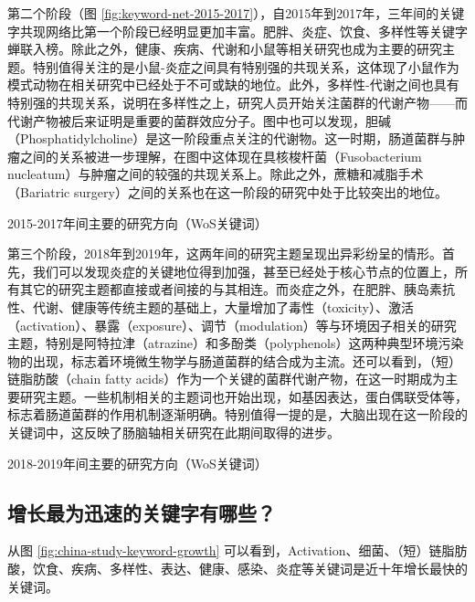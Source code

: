 \documentclass[]{ctexbook}
\begin{document}
第二个阶段（图 \ref{fig:keyword-net-2015-2017}），自2015年到2017年，三年间的关键字共现网络比第一个阶段已经明显更加丰富。肥胖、炎症、饮食、多样性等关键字蝉联入榜。除此之外，健康、疾病、代谢和小鼠等相关研究也成为主要的研究主题。特别值得关注的是小鼠-炎症之间具有特别强的共现关系，这体现了小鼠作为模式动物在相关研究中已经处于不可或缺的地位。此外，多样性-代谢之间也具有特别强的共现关系，说明在多样性之上，研究人员开始关注菌群的代谢产物------而代谢产物被后来证明是重要的菌群效应分子。图中也可以发现，胆碱（Phosphatidylcholine）是这一阶段重点关注的代谢物。这一时期，肠道菌群与肿瘤之间的关系被进一步理解，在图中这体现在具核梭杆菌（Fusobacterium nucleatum）与肿瘤之间的较强的共现关系上。除此之外，蔗糖和减脂手术（Bariatric surgery）之间的关系也在这一阶段的研究中处于比较突出的地位。

\hypertarget{htmlwidget-711cc3b1207186563016}{}

\label{fig:keyword-net-2015-2017}2015-2017年间主要的研究方向（WoS关键词）

第三个阶段，2018年到2019年，这两年间的研究主题呈现出异彩纷呈的情形。首先，我们可以发现炎症的关键地位得到加强，甚至已经处于核心节点的位置上，所有其它的研究主题都直接或者间接的与其相连。而炎症之外，在肥胖、胰岛素抗性、代谢、健康等传统主题的基础上，大量增加了毒性（toxicity）、激活（activation）、暴露（exposure）、调节（modulation）等与环境因子相关的研究主题，特别是阿特拉津（atrazine）和多酚类（polyphenols）这两种典型环境污染物的出现，标志着环境微生物学与肠道菌群的结合成为主流。还可以看到，（短）链脂肪酸（chain fatty acids）作为一个关键的菌群代谢产物，在这一时期成为主要研究主题。一些机制相关的主题词也开始出现，如基因表达，蛋白偶联受体等，标志着肠道菌群的作用机制逐渐明确。特别值得一提的是，大脑出现在这一阶段的关键词中，这反映了肠脑轴相关研究在此期间取得的进步。

\hypertarget{htmlwidget-9a7d290be55d937f9fda}{}

\label{fig:keyword-net-2018-2019}2018-2019年间主要的研究方向（WoS关键词）

\hypertarget{ux589eux957fux6700ux4e3aux8fc5ux901fux7684ux5173ux952eux5b57ux6709ux54eaux4e9b}{%
\subsection{增长最为迅速的关键字有哪些？}\label{ux589eux957fux6700ux4e3aux8fc5ux901fux7684ux5173ux952eux5b57ux6709ux54eaux4e9b}}

从图 \ref{fig:china-study-keyword-growth} 可以看到，Activation、细菌、（短）链脂肪酸，饮食、疾病、多样性、表达、健康、感染、炎症等关键词是近十年增长最快的关键词。
\end{document}
